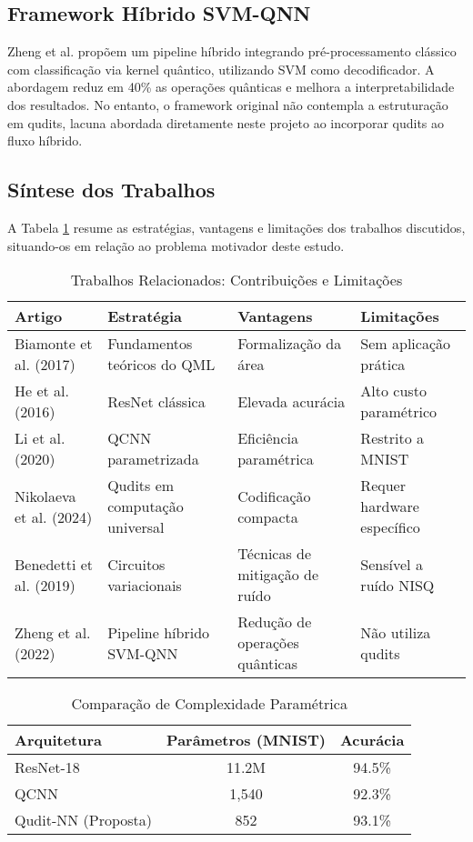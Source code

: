 \documentclass[12pt]{article}
\begin{document}
\subsection{Framework Híbrido SVM-QNN}

Zheng et al. \cite{Zheng2022} propõem um pipeline híbrido integrando pré-processamento clássico com classificação via kernel quântico, utilizando SVM como decodificador. A abordagem reduz em 40\% as operações quânticas e melhora a interpretabilidade dos resultados. No entanto, o framework original não contempla a estruturação em qudits, lacuna abordada diretamente neste projeto ao incorporar qudits ao fluxo híbrido.

\subsection{Síntese dos Trabalhos}

A Tabela \ref{tab:relacionados} resume as estratégias, vantagens e limitações dos trabalhos discutidos, situando-os em relação ao problema motivador deste estudo.

\begin{table}[H]
\centering
\caption{Trabalhos Relacionados: Contribuições e Limitações}
\label{tab:relacionados}
\begin{tabular}{|p{2.5cm}|p{4cm}|p{3.5cm}|p{3.5cm}|}
\hline
\textbf{Artigo} & \textbf{Estratégia} & \textbf{Vantagens} & \textbf{Limitações} \\ \hline
Biamonte et al. (2017) & Fundamentos teóricos do QML & Formalização da área & Sem aplicação prática \\ \hline
He et al. (2016) & ResNet clássica & Elevada acurácia & Alto custo paramétrico \\ \hline
Li et al. (2020) & QCNN parametrizada & Eficiência paramétrica & Restrito a MNIST \\ \hline
Nikolaeva et al. (2024) & Qudits em computação universal & Codificação compacta & Requer hardware específico \\ \hline
Benedetti et al. (2019) & Circuitos variacionais & Técnicas de mitigação de ruído & Sensível a ruído NISQ \\ \hline
Zheng et al. (2022) & Pipeline híbrido SVM-QNN & Redução de operações quânticas & Não utiliza qudits \\ \hline
\end{tabular}
\end{table}

\begin{table}[H]
\centering
\caption{Comparação de Complexidade Paramétrica}
\label{tab:comparacao}
\begin{tabular}{|l|c|c|}
\hline
\textbf{Arquitetura} & \textbf{Parâmetros (MNIST)} & \textbf{Acurácia} \\ \hline
ResNet-18 \cite{He2016} & 11.2M & 94.5\% \\ \hline
QCNN \cite{Li2020} & 1,540 & 92.3\% \\ \hline
Qudit-NN (Proposta) & 852 & 93.1\% \\ \hline
\end{tabular}
\end{table}
\end{document}

